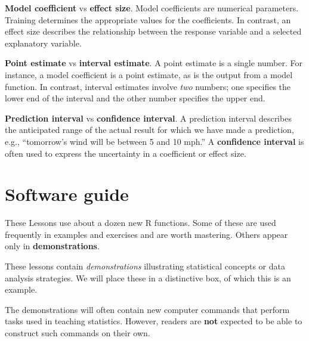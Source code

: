 \documentclass[
  letterpaper,
  DIV=11,
  numbers=noendperiod,
  oneside]{scrreprt}
\begin{document}
\textbf{Model coefficient} vs \textbf{effect size}. Model coefficients
are numerical parameters. Training determines the appropriate values for
the coefficients. In contrast, an effect size describes the relationship
between the response variable and a selected explanatory variable.

\textbf{Point estimate} vs \textbf{interval estimate}. A point estimate
is a single number. For instance, a model coefficient is a point
estimate, as is the output from a model function. In contrast, interval
estimates involve \emph{two} numbers; one specifies the lower end of the
interval and the other number specifies the upper end.

\textbf{Prediction interval} vs \textbf{confidence interval}. A
prediction interval describes the anticipated range of the actual result
for which we have made a prediction, e.g., ``tomorrow's wind will be
between 5 and 10 mph.'' A \textbf{confidence interval} is often used to
express the uncertainty in a coefficient or effect size.

\hypertarget{software-guide}{%
\section*{Software guide}\label{software-guide}}


These Lessons use about a dozen new R functions. Some of these are used
frequently in examples and exercises and are worth mastering. Others
appear only in \textbf{demonstrations}.

\begin{tcolorbox}[enhanced jigsaw, colbacktitle=quarto-callout-warning-color!10!white, breakable, opacitybacktitle=0.6, colback=white, left=2mm, arc=.35mm, colframe=quarto-callout-warning-color-frame, coltitle=black, toprule=.15mm, opacityback=0, leftrule=.75mm, bottomtitle=1mm, toptitle=1mm, titlerule=0mm, title=\textcolor{quarto-callout-warning-color}{\faExclamationTriangle}\hspace{0.5em}{Demonstrations}, rightrule=.15mm, bottomrule=.15mm]

These lessons contain \emph{demonstrations} illustrating statistical
concepts or data analysis strategies. We will place these in a
distinctive box, of which this is an example.

The demonstrations will often contain new computer commands that perform
tasks used in teaching statistics. However, readers are \textbf{not}
expected to be able to construct such commands on their own.

\end{tcolorbox}
\end{document}
